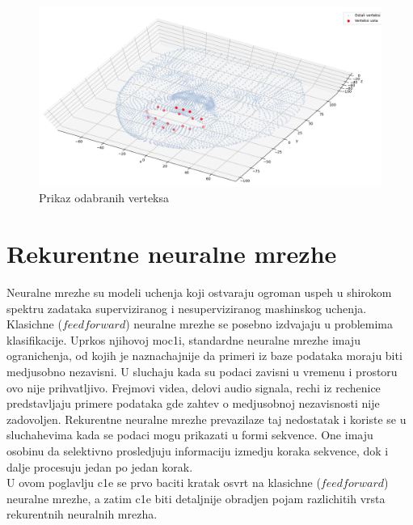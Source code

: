 \documentclass[a4paper, openany, oneside, 11pt]{book}
\begin{document}
\begin{figure}[h!]
\centering
  \includegraphics[scale=0.45]{res/verteksi.png}
  \caption{Prikaz odabranih verteksa}
  \label{fig:2_9}
  \vspace{0pt}
\end{figure}
\chapter{Rekurentne neuralne mrezhe}
Neuralne mrezhe su modeli uchenja koji ostvaraju ogroman uspeh u shirokom spektru zadataka superviziranog i nesuperviziranog mashinskog uchenja. Klasichne ($feedforward$) neuralne mrezhe se posebno izdvajaju u problemima klasifikacije. Uprkos njihovoj moc1i, standardne neuralne mrezhe imaju ogranichenja, od kojih je naznachajnije da primeri iz baze podataka moraju biti medjusobno nezavisni. U sluchaju kada su podaci zavisni u vremenu i prostoru ovo nije prihvatljivo. Frejmovi videa, delovi audio signala, rechi iz rechenice predstavljaju primere podataka gde zahtev o medjusobnoj nezavisnosti nije zadovoljen. Rekurentne neuralne mrezhe prevazilaze taj nedostatak i koriste se u sluchahevima kada se podaci mogu prikazati u formi sekvence. One imaju osobinu da selektivno prosledjuju informaciju izmedju koraka sekvence, dok i dalje procesuju jedan po jedan korak.\\
U ovom poglavlju c1e se prvo baciti kratak osvrt na klasichne ($feedforward$) neuralne mrezhe, a zatim c1e biti detaljnije obradjen pojam razlichitih vrsta rekurentnih neuralnih mrezha.
\end{document}
